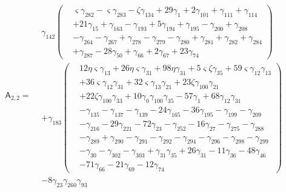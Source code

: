 \[\mathsf A_{2,2}=\begin{aligned}& \gamma_{142} \left(\begin{aligned}& \varsigma  \gamma_{282}- \varsigma  \gamma_{283}- \zeta  \gamma_{134}+ 29 \gamma_{1}+ 2 \gamma_{101}+ \gamma_{111}+ \gamma_{114}\\&+ 21 \gamma_{15}+ \gamma_{163}- \gamma_{193}+ 5 \gamma_{194}+ \gamma_{195}- \gamma_{200}+ \gamma_{208}\\&- \gamma_{264}- \gamma_{267}+ \gamma_{278}- \gamma_{279}- \gamma_{280}+ \gamma_{281}+ \gamma_{282}+ \gamma_{284}\\&+ \gamma_{287}- 28 \gamma_{50}+ \gamma_{66}+ 2 \gamma_{67}+ 23 \gamma_{74}\end{aligned}\right)\\&+ \gamma_{183} \left(\begin{aligned}& 12 \eta  \varsigma  \gamma_{13}+ 26 \eta  \varsigma  \gamma_{31}+ 98 \eta  \gamma_{31}+ 5 \varsigma  \zeta  \gamma_{35}+ 59 \varsigma  \gamma_{12} \gamma_{13}\\&+ 36 \varsigma  \gamma_{12} \gamma_{31}+ 32 \varsigma  \gamma_{13} \gamma_{21}+ 23 \zeta  \gamma_{100} \gamma_{21}\\&+ 22 \zeta  \gamma_{100} \gamma_{33}+ 10 \gamma_{0} \gamma_{100} \gamma_{35}- 57 \gamma_{1}+ 68 \gamma_{12} \gamma_{31}\\&- \gamma_{135}- \gamma_{137}- \gamma_{139}- 24 \gamma_{165}- 36 \gamma_{195}- \gamma_{199}- \gamma_{209}\\&- \gamma_{216}- 29 \gamma_{221}- 72 \gamma_{23}- \gamma_{252}- 16 \gamma_{27}- \gamma_{275}- \gamma_{288}\\&- \gamma_{289}+ \gamma_{290}- \gamma_{291}- \gamma_{292}- \gamma_{294}- \gamma_{296}- \gamma_{298}- \gamma_{299}\\&- \gamma_{30}- \gamma_{302}- \gamma_{303}+ \gamma_{31} \gamma_{35}+ 26 \gamma_{31}- 11 \gamma_{36}- 48 \gamma_{46}\\&- 71 \gamma_{66}- 21 \gamma_{69}- 12 \gamma_{74}\end{aligned}\right)\\&- 8 \gamma_{23} \gamma_{260} \gamma_{93}\end{aligned}\]

